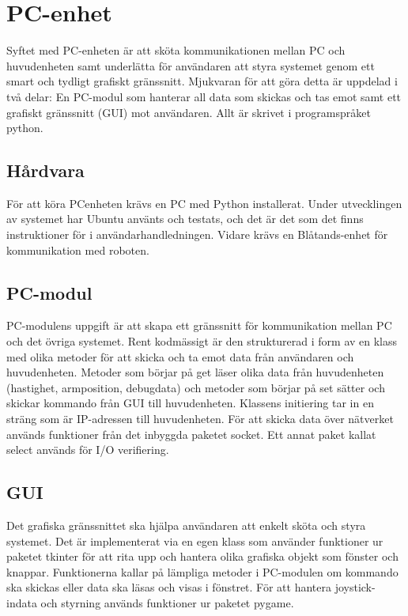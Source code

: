 
\section{PC-enhet}
Syftet med PC-enheten är att sköta kommunikationen mellan PC och huvudenheten samt
underlätta för användaren att styra systemet genom ett smart och tydligt grafiskt gränssnitt.
Mjukvaran för att göra detta är uppdelad i två delar: En PC-modul som hanterar all data som
skickas och tas emot samt ett grafiskt gränssnitt (GUI) mot användaren. Allt är skrivet i
programspråket python.

\subsection{Hårdvara}
För att köra PCenheten krävs en PC med Python installerat. Under utvecklingen av systemet har Ubuntu använts och testats, och det är det som det finns instruktioner för i användarhandledningen. Vidare krävs en Blåtands-enhet för kommunikation med roboten.

\subsection{PC-modul}
PC-modulens uppgift är att skapa ett gränssnitt för kommunikation mellan PC och det övriga
systemet. Rent kodmässigt är den strukturerad i form av en klass med olika metoder för att skicka
och ta emot data från användaren och huvudenheten. Metoder som börjar på get läser olika data från
huvudenheten (hastighet, armposition, debugdata) och metoder som börjar på set sätter och skickar
kommando från GUI till huvudenheten. Klassens initiering tar in en sträng som är IP-adressen till
huvudenheten. För att skicka data över nätverket används funktioner från det inbyggda paketet
socket. Ett annat paket kallat select används för I/O verifiering.

\subsection{GUI}
Det grafiska gränssnittet ska hjälpa användaren att enkelt sköta och styra systemet.
Det är implementerat via en egen klass som använder funktioner ur paketet tkinter för att rita
upp och hantera olika grafiska objekt som fönster och knappar. Funktionerna kallar på lämpliga
metoder i PC-modulen om kommando ska skickas eller data ska läsas och visas i fönstret. För att
hantera joystick-indata och styrning används funktioner ur paketet pygame.
